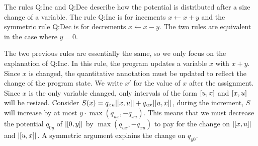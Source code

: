 \documentclass[nocopyrightspace,preprint,pldi]{sigplanconf-pldi15}
\newcommand{\iffull}[2]{\ifx\fullversion\undefined{#2}\else{#1}\fi}
\begin{document}

The rules {\sc Q:Inc} and {\sc Q:Dec} describe how the potential is
distributed after a size change of a variable.
The rule {\sc Q:Inc} is for incements $x \gets x+y$ and the symmetric
rule {\sc Q:Dec} is for decrements $x \gets x-y$.
The two rules are equivalent in the case where $y=0$.

The two previous rules are essentially the same, so we only focus on
the explanation of {\sc Q:Inc}. In this rule, the program updates a
variable $x$ with $x+y$.  Since $x$ is changed, the
quantitative annotation must be updated to reflect the change of the
program state.  We write $x'$ for the value of $x$ after the assignment.
Since $x$ is the only variable changed, only intervals of the form
$[u,x]$ and $[x,u]$ will be resized.  Consider $S(x) = q_{xu}
|[x,u]| + q_{ux} |[u,x]|$, during the increment, $S$ will
increase by at most $y \cdot \max(q_{ux}, -q_{xu})$.
This means that we must decrease the potential $q_{0y}$ of $|[0,y]|$
by $\max(q_{ux}, -q_{xu})$ to pay for the change on
$|[x,u]|$ and $|[u,x]|$.  A symmetric argument explains the
change on $q_{y0}$.
\end{document}
